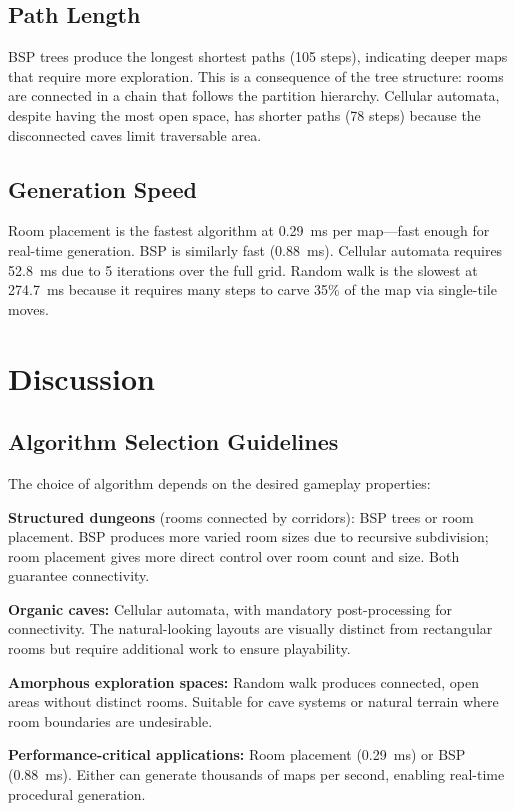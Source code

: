 \documentclass[11pt,a4paper]{article}
\begin{document}
\subsection{Path Length}

BSP trees produce the longest shortest paths (105 steps), indicating deeper maps that require more exploration. This is a consequence of the tree structure: rooms are connected in a chain that follows the partition hierarchy. Cellular automata, despite having the most open space, has shorter paths (78 steps) because the disconnected caves limit traversable area.

\subsection{Generation Speed}

Room placement is the fastest algorithm at 0.29~ms per map---fast enough for real-time generation. BSP is similarly fast (0.88~ms). Cellular automata requires 52.8~ms due to 5 iterations over the full grid. Random walk is the slowest at 274.7~ms because it requires many steps to carve 35\% of the map via single-tile moves.

\section{Discussion}

\subsection{Algorithm Selection Guidelines}

The choice of algorithm depends on the desired gameplay properties:

\textbf{Structured dungeons} (rooms connected by corridors): BSP trees or room placement. BSP produces more varied room sizes due to recursive subdivision; room placement gives more direct control over room count and size. Both guarantee connectivity.

\textbf{Organic caves:} Cellular automata, with mandatory post-processing for connectivity. The natural-looking layouts are visually distinct from rectangular rooms but require additional work to ensure playability.

\textbf{Amorphous exploration spaces:} Random walk produces connected, open areas without distinct rooms. Suitable for cave systems or natural terrain where room boundaries are undesirable.

\textbf{Performance-critical applications:} Room placement (0.29~ms) or BSP (0.88~ms). Either can generate thousands of maps per second, enabling real-time procedural generation.
\end{document}
